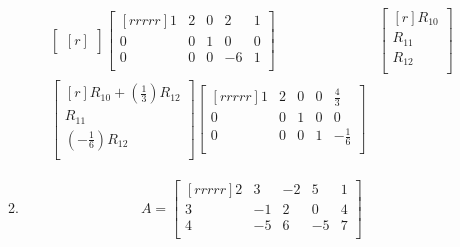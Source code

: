 \documentclass[12pt]{article}
\begin{document}
\begin{enumerate}
\begin{enumerate}
\begin{align*}
\begin{bmatrix}[r]
	\end{bmatrix}
	\begin{bmatrix}[rrrrr]
	1 & 2 & 0 & 2 & 1\\
	0 & 0 & 1 & 0 & 0\\
	0 & 0 & 0 & -6 & 1\\
	\end{bmatrix}&
	\begin{bmatrix}[r]
	R_{10}\\ R_{11}\\ R_{12}\\
	\end{bmatrix}\\
	\begin{bmatrix}[r]
	R_{10} + (\frac{1}{3})R_{12}\\
	R_{11}\\
	(-\frac{1}{6})R_{12}\\
	\end{bmatrix}
	\begin{bmatrix}[rrrrr]
	1 & 2 & 0 & 0 & \frac{4}{3}\\
	0 & 0 & 1 & 0 & 0\\
	0 & 0 & 0 & 1 & -\frac{1}{6}\\
	\end{bmatrix}&	
	\end{align*}
	\item
	\begin{align*}
	A = 
	\begin{bmatrix}[rrrrr]
	2 & 3 & -2 & 5 & 1\\
	3 & -1 & 2 & 0 & 4\\
	4 & -5 & 6 & -5 & 7\\
	\end{bmatrix}
	\end{align*}
	

\end{enumerate}
\end{enumerate}
\end{document}
